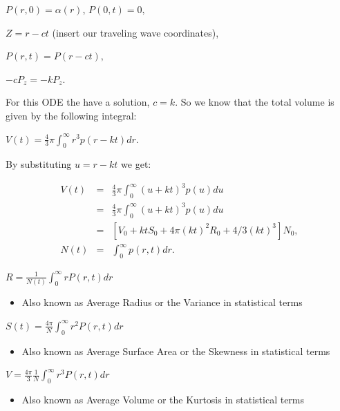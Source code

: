 \documentclass[]{article}
\numberwithin{equation}{section}		%
\def\bea{\begin{eqnarray}}
\def\ena{\end{eqnarray}}
\begin{document}
\begin{center}
$P (r,0 )=\alpha (r )$, $P (0,t )= 0,$
\end{center}
\begin{center}
$Z = r - ct$  (insert our traveling wave coordinates),
\end{center}
\begin{center}
$P (r,t )= P (r-ct ),$
\end{center}
\begin{center}
$-cP_{z}=-kP_{z}.$
\end{center}

For this ODE the have a solution, $c=k$. So we know that the total volume is given by the following integral:

\begin{center}
$V(t) = \frac{4}{3}\pi \int_{0}^{\infty} r^{3}p(r-kt)dr.$
\end{center}
By substituting $u= r-kt$ we get:

\begin{center}
\bea
V(t)& =& \frac{4}{3}\pi \int_{0}^{\infty}(u+kt)^{3}p(u)du\\
 &=& \frac{4}{3}\pi \int_{0}^{\infty}(u+kt)^{3}p(u)du  \\
 &=& [V_{0} + ktS_{0}+4\pi(kt)^{2}R_{0}+4/3(kt)^{3}] N_{0},\\
N(t) &=& \int_{0}^{\infty}p(r,t)dr.
\ena
\end{center}

$R = \frac{1}{N (t )}\int _{0}^{\infty} rP (r,t )dr$\\
\begin{itemize}
\item Also known as Average Radius or the Variance in statistical terms
\end{itemize}

$S (t )=\frac{4\pi}{N}\int _{0}^{\infty} r^{2}P (r,t )dr$
\begin{itemize}
\item Also known as Average Surface Area or the Skewness in statistical terms
\end{itemize}
$V = \frac{4\pi}{3}\frac{1}{N}\int _{0}^{\infty} r^{3}P (r,t )dr$
\begin{itemize}
\item Also known as Average Volume or the Kurtosis in statistical terms
\end{itemize}
\end{document}
